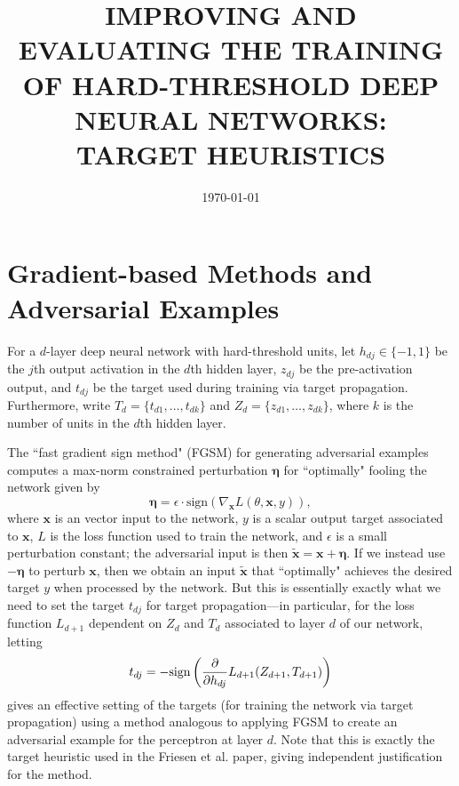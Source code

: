 \documentclass[12pt,letterpaper]{article}
\begin{document}
\title{\uppercase{\textbf{\normalsize Improving and Evaluating the Training of Hard-Threshold Deep Neural Networks: \\
Target Heuristics}}}
\author{\small{\textsc{}}}
\date{\small{\textsc{\today}}}
\maketitle

\allowdisplaybreaks

\section{Gradient-based Methods and Adversarial Examples}

For a $d$-layer deep neural network with hard-threshold units, let $h_{dj} \in \{-1, 1\}$ be the $j$th output activation in the $d$th hidden layer, $z_{dj}$ be the pre-activation output, and $t_{dj}$ be the target used during training via target propagation. Furthermore, write $T_{d} = \{t_{d1}, \ldots, t_{dk}\}$ and $Z_{d} = \{z_{d1}, \ldots, z_{dk}\}$, where $k$ is the number of units in the $d$th hidden layer. 

The ``fast gradient sign method" (FGSM) for generating adversarial examples computes a max-norm constrained perturbation $\mathbf{\eta}$ for ``optimally" fooling the network given by
$$\mathbf{\eta} = \epsilon \cdot \textrm{sign}(\nabla_{\mathbf{x}}L(\theta, \mathbf{x}, y)),$$ 
where $\mathbf{x}$ is an vector input to the network, $y$ is a scalar output target associated to $\mathbf{x}$, $L$ is the loss function used to train the network, and $\epsilon$ is a small perturbation constant; the adversarial input is then $\tilde{\mathbf{x}} = \mathbf{x} + \mathbf{\eta}$. If we instead use $-\mathbf{\eta}$ to perturb $\mathbf{x}$, then we obtain an input $\tilde{\mathbf{x}}$ that ``optimally" achieves the desired target $y$ when processed by the network. But this is essentially exactly what we need to set the target $t_{dj}$ for target propagation---in particular, for the loss function $L_{d+1}$ dependent on $Z_{d}$ and $T_{d}$ associated to layer $d$ of our network, letting
$$t_{dj} = -\textrm{sign}\left({\partial \over \partial h_{dj}}L_{d+1}(Z_{d+1}, T_{d+1})\right)$$
gives an effective setting of the targets (for training the network via target propagation) using a method analogous to applying FGSM to create an adversarial example for the perceptron at layer $d$. Note that this is exactly the target heuristic used in the Friesen et al. paper, giving independent justification for the method. 
\end{document}
